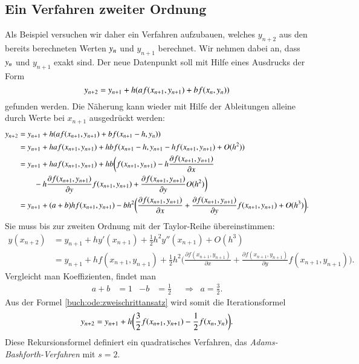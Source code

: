 \subsection{Ein Verfahren zweiter Ordnung
\label{buch:ode:subsection:zweiteordnung}}
Als Beispiel versuchen wir daher ein Verfahren aufzubauen, welches
$y_{n+2}$ aus den bereits berechneten Werten $y_{n\mathstrut}$ und
$y_{n+1}$ berechnet.
Wir nehmen dabei an, dass $y_{n\mathstrut}$ und $y_{n+1}$ exakt
sind.
Der neue Datenpunkt soll mit Hilfe eines Ausdrucks der Form
\begin{equation}
y_{n+2}
=
y_{n+1} + h(af(x_{n+1},y_{n+1}) + b f(x_{n\mathstrut},y_{n\mathstrut}))
\label{buch:ode:zweischrittansatz}
\end{equation}
gefunden werden.
Die Näherung kann wieder mit Hilfe der Ableitungen alleine
durch Werte bei $x_{n+1}$ ausgedrückt werden:
\begin{align*}
y_{n+2}
&=
y_{n+1}+h(af(x_{n+1}, y_{n+1}) + bf(x_{n+1}-h, y_{n\mathstrut}))
\\
&=
y_{n+1}+haf(x_{n+1}, y_{n+1}) + hbf(x_{n+1}-h, y_{n+1} - h f(x_{n+1},y_{n+1}) + O(h^2))
\\
&=
y_{n+1}+haf(x_{n+1}, y_{n+1}) + hb
\biggl(
f(x_{n+1},y_{n+1})
-h \frac{\partial f(x_{n+1},y_{n+1})}{\partial x}
\\
&\qquad
-h
\frac{\partial f(x_{n+1},y_{n+1})}{\partial y}
f(x_{n+1},y_{n+1})
+ 
\frac{\partial f(x_{n+1},y_{n+1})}{\partial y}
O(h^2)
\biggr)
\\
&=
y_{n+1}
+ (a+b)hf(x_{n+1},y_{n+1})
- bh^2\biggl(
\frac{\partial f(x_{n+1},y_{n+1})}{\partial x}
+
\frac{\partial f(x_{n+1},y_{n+1})}{\partial y}
f(x_{n+1},y_{n+1})
+O(h^3)
\biggr).
\end{align*}
Sie muss bis zur zweiten Ordnung mit der Taylor-Reihe übereinstimmen:
\begin{align*}
y(x_{n+2})
&=
y_{n+1} + hy'(x_{n+1}) + \frac12h^2 y''(x_{n+1})+O(h^3)
\\
&=
y_{n+1}+hf(x_{n+1},y_{n+1})+\frac12h^2\biggl(
\frac{\partial f(x_{n+1},y_{n+1})}{\partial x}
+
\frac{\partial f(x_{n+1},y_{n+1})}{\partial y}
f(x_{n+1},y_{n+1})
\biggr).
\end{align*}
Vergleicht man Koeffizienten, findet man
\[
\begin{aligned}
a+b&=1&-b&=\frac12&&\Rightarrow&a=\frac32.
\end{aligned}
\]
Aus der Formel \eqref{buch:ode:zweischrittansatz} wird somit die
Iterationsformel
\begin{equation}
y_{n+2}
=
y_{n+1}+h\biggl(\frac32f(x_{n+1},y_{n+1})
- \frac12 f(x_{n\mathstrut},y_{n\mathstrut})\biggr).
\label{buch:ode:mehrschritt:2}
\end{equation}
Diese Rekursionsformel definiert ein quadratisches Verfahren, das
{\em Adams-Bashforth-Verfahren} mit $s=2$.
%

